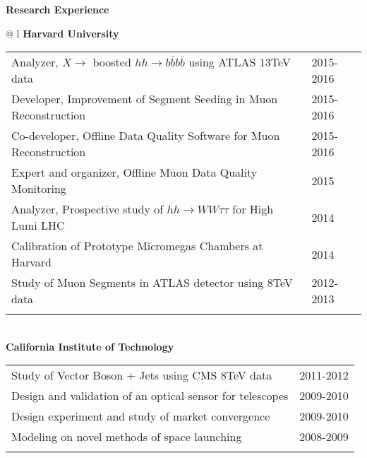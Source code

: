 \documentclass[letterpaper,11pt,oneside]{article}
\begin{document}
 \raggedright
 \textbf{\Large{Research Experience}} \\
 \normalsize
\begin{flushleft}
\hspace{1cm}
 \begin{tabular}{@{} l}
    \textbf{Harvard University} \\ 
    \vspace{0.2cm}
    \begin{tabular}{@{} l l }
 Analyzer, $X \to$ boosted $ hh \to b\bar{b}b\bar{b}$ using ATLAS $13$TeV data & 2015-2016\\
 Developer, Improvement of Segment Seeding in Muon Reconstruction & 2015-2016\\
 Co-developer, Offline Data Quality Software for Muon Reconstruction & 2015-2016\\
 Expert and organizer,  Offline Muon Data Quality Monitoring & 2015\\
 Analyzer, Prospective study of $hh \to WW\tau\tau$ for High Lumi LHC & 2014\\
 Calibration of Prototype Micromegas Chambers at Harvard & 2014\\
 Study of Muon Segments in ATLAS detector using $8$TeV data & 2012-2013\\
    \hspace{0.8\linewidth} & \hspace{0.1\linewidth} \\
     \end{tabular}
     \\
     \textbf{California Institute of Technology} \\
     \vspace{0.2cm}
     \begin{tabular}{@{} l l }
 Study of Vector Boson + Jets using CMS $8$TeV data&2011-2012\\
 Design and validation of an optical sensor for telescopes&2009-2010\\
 Design experiment and study of market convergence &2009-2010\\
 Modeling on novel methods of space launching&2008-2009\\
    \hspace{0.8\linewidth} & \hspace{0.1\linewidth} \\
      \end{tabular}
      \end{tabular}
\end{flushleft}
\end{document}
